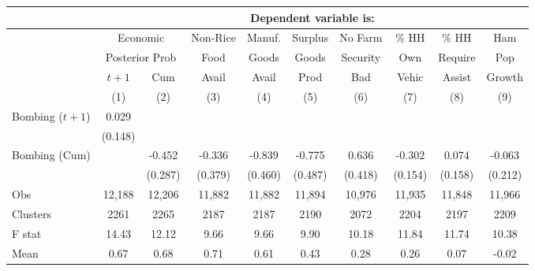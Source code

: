 \begin{tabular}{lccccccccc}
\hline  & \multicolumn{9}{c}{Dependent variable is:}\\
\hline  & \multicolumn{2}{c}{Economic} & Non-Rice & Manuf. & Surplus & No Farm & \% HH & \% HH & Ham\\
 & \multicolumn{2}{c}{Posterior Prob} & Food & Goods & Goods & Security & Own & Require & Pop\\
 & $ t+1$ & Cum & Avail & Avail & Prod & Bad & Vehic & Assist & Growth\\
 & (1) & (2) & (3) & (4) & (5) & (6) & (7) & (8) & (9)\\
\hline Bombing ($ t+1$) & 0.029 &  &  &  &  &  &  &  & \\
 & (0.148) &  &  &  &  &  &  &  & \\
Bombing (Cum) &  & -0.452 & -0.336 & -0.839 & -0.775 & 0.636 & -0.302 & 0.074 & -0.063\\
 &  & (0.287) & (0.379) & (0.460) & (0.487) & (0.418) & (0.154) & (0.158) & (0.212)\\
Obs & 12,188 & 12,206 & 11,882 & 11,882 & 11,894 & 10,976 & 11,935 & 11,848 & 11,966\\
Clusters & 2261  & 2265  & 2187  & 2187  & 2190  & 2072  & 2204  & 2197  & 2209 \\
F stat & 14.43  & 12.12  & 9.66  & 9.66  & 9.90  & 10.18  & 11.84  & 11.74  & 10.38 \\
Mean & 0.67 & 0.68 & 0.71 & 0.61 & 0.43 & 0.28 & 0.26 & 0.07 & -0.02\\
\hline\end{tabular}\\
